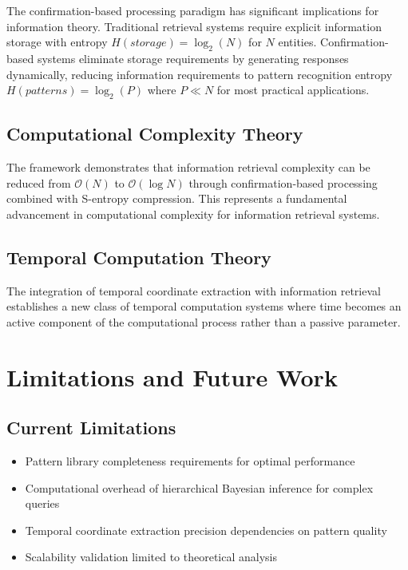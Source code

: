 \documentclass[12pt,a4paper]{article}
\begin{document}
The confirmation-based processing paradigm has significant implications for information theory. Traditional retrieval systems require explicit information storage with entropy $H(storage) = \log_2(N)$ for $N$ entities. Confirmation-based systems eliminate storage requirements by generating responses dynamically, reducing information requirements to pattern recognition entropy $H(patterns) = \log_2(P)$ where $P \ll N$ for most practical applications.

\subsection{Computational Complexity Theory}

The framework demonstrates that information retrieval complexity can be reduced from $\mathcal{O}(N)$ to $\mathcal{O}(\log N)$ through confirmation-based processing combined with S-entropy compression. This represents a fundamental advancement in computational complexity for information retrieval systems.

\subsection{Temporal Computation Theory}

The integration of temporal coordinate extraction with information retrieval establishes a new class of temporal computation systems where time becomes an active component of the computational process rather than a passive parameter.

\section{Limitations and Future Work}

\subsection{Current Limitations}

\begin{itemize}
\item Pattern library completeness requirements for optimal performance
\item Computational overhead of hierarchical Bayesian inference for complex queries
\item Temporal coordinate extraction precision dependencies on pattern quality
\item Scalability validation limited to theoretical analysis
\end{itemize}
\end{document}
